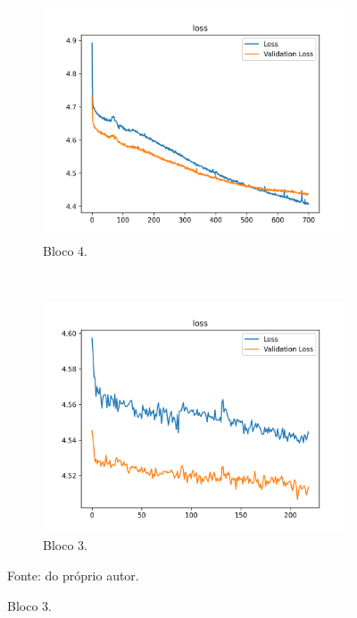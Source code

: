 \begin{figure}[H]
     \begin{subfigure}[t]{0.45\textwidth}
         \centering
         \includegraphics[width=1\linewidth]{recursos/imagens/results/food_loss2.png}
         \caption{Bloco 4.}
         \label{results:fig:datasets:4.3}
     \end{subfigure}
     ~
     \begin{subfigure}[t]{0.45\textwidth}
         \centering
         \includegraphics[width=1\linewidth]{recursos/imagens/results/food_loss3.png}
         \caption{Bloco 3.}
         \label{results:fig:datasets:4.4}
     \end{subfigure}
     
     Fonte: do próprio autor.
 \end{figure}

